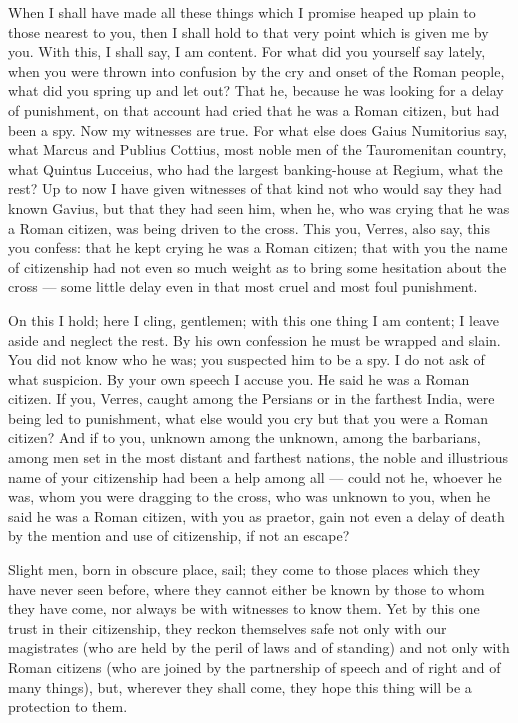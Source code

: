  When I shall have made all these things which I promise heaped up plain to those nearest to you, then I shall hold to that very point which is given me by you. With this, I shall say, I am content. For what did you yourself say lately, when you were thrown into confusion by the cry and onset of the Roman people, what did you spring up and let out? That he, because he was looking for a delay of punishment, on that account had cried that he was a Roman citizen, but had been a spy. Now my witnesses are true. For what else does Gaius Numitorius say, what Marcus and Publius Cottius, most noble men of the Tauromenitan country, what Quintus Lucceius, who had the largest banking-house at Regium, what the rest? Up to now I have given witnesses of that kind not who would say they had known Gavius, but that they had seen him, when he, who was crying that he was a Roman citizen, was being driven to the cross. This you, Verres, also say, this you confess: that he kept crying he was a Roman citizen; that with you the name of citizenship had not even so much weight as to bring some hesitation about the cross --- some little delay even in that most cruel and most foul punishment.

 On this I hold; here I cling, gentlemen; with this one thing I am content; I leave aside and neglect the rest. By his own confession he must be wrapped and slain. You did not know who he was; you suspected him to be a spy. I do not ask of what suspicion. By your own speech I accuse you. He said he was a Roman citizen. If you, Verres, caught among the Persians or in the farthest India, were being led to punishment, what else would you cry but that you were a Roman citizen? And if to you, unknown among the unknown, among the barbarians, among men set in the most distant and farthest nations, the noble and illustrious name of your citizenship had been a help among all --- could not he, whoever he was, whom you were dragging to the cross, who was unknown to you, when he said he was a Roman citizen, with you as praetor, gain not even a delay of death by the mention and use of citizenship, if not an escape?

 Slight men, born in obscure place, sail; they come to those places which they have never seen before, where they cannot either be known by those to whom they have come, nor always be with witnesses to know them. Yet by this one trust in their citizenship, they reckon themselves safe not only with our magistrates (who are held by the peril of laws and of standing) and not only with Roman citizens (who are joined by the partnership of speech and of right and of many things), but, wherever they shall come, they hope this thing will be a protection to them.

